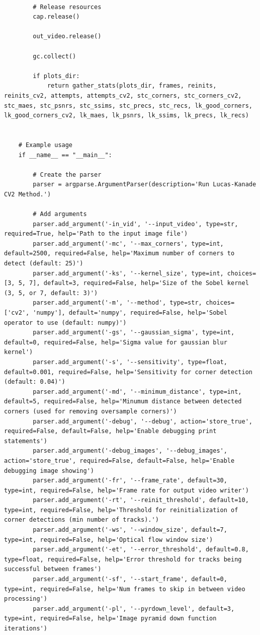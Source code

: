 \documentclass[11pt, conference, letterpaper]{IEEEtran}
\begin{document}
\begin{lstlisting}[style=python, caption={\texttt{lucas\_kanade.py}}, label={lst:lk}]
    
        # Release resources
        cap.release()
    
        out_video.release()
        
        gc.collect()
        
        if plots_dir:
            return gather_stats(plots_dir, frames, reinits, reinits_cv2, attempts, attempts_cv2, stc_corners, stc_corners_cv2, stc_maes, stc_psnrs, stc_ssims, stc_precs, stc_recs, lk_good_corners, lk_good_corners_cv2, lk_maes, lk_psnrs, lk_ssims, lk_precs, lk_recs)
    
    
    # Example usage
    if __name__ == "__main__":
    
        # Create the parser
        parser = argparse.ArgumentParser(description='Run Lucas-Kanade CV2 Method.')
    
        # Add arguments
        parser.add_argument('-in_vid', '--input_video', type=str, required=True, help='Path to the input image file')
        parser.add_argument('-mc', '--max_corners', type=int, default=2500, required=False, help='Maximum number of corners to detect (default: 25)')
        parser.add_argument('-ks', '--kernel_size', type=int, choices=[3, 5, 7], default=3, required=False, help='Size of the Sobel kernel (3, 5, or 7, default: 3)')
        parser.add_argument('-m', '--method', type=str, choices=['cv2', 'numpy'], default='numpy', required=False, help='Sobel operator to use (default: numpy)')
        parser.add_argument('-gs', '--gaussian_sigma', type=int, default=0, required=False, help='Sigma value for gaussian blur kernel')
        parser.add_argument('-s', '--sensitivity', type=float, default=0.001, required=False, help='Sensitivity for corner detection (default: 0.04)')
        parser.add_argument('-md', '--minimum_distance', type=int, default=5, required=False, help='Minumum distance between detected corners (used for removing oversample corners)')
        parser.add_argument('-debug', '--debug', action='store_true', required=False, default=False, help='Enable debugging print statements')
        parser.add_argument('-debug_images', '--debug_images', action='store_true', required=False, default=False, help='Enable debugging image showing')
        parser.add_argument('-fr', '--frame_rate', default=30, type=int, required=False, help='Frame rate for output video writer')
        parser.add_argument('-rt', '--reinit_threshold', default=10, type=int, required=False, help='Threshold for reinitialization of corner detections (min number of tracks).')
        parser.add_argument('-ws', '--window_size', default=7, type=int, required=False, help='Optical flow window size')
        parser.add_argument('-et', '--error_threshold', default=0.8, type=float, required=False, help='Error threshold for tracks being successful between frames')
        parser.add_argument('-sf', '--start_frame', default=0, type=int, required=False, help='Num frames to skip in between video processing')
        parser.add_argument('-pl', '--pyrdown_level', default=3, type=int, required=False, help='Image pyramid down function iterations')
    

\end{lstlisting}
\end{document}
